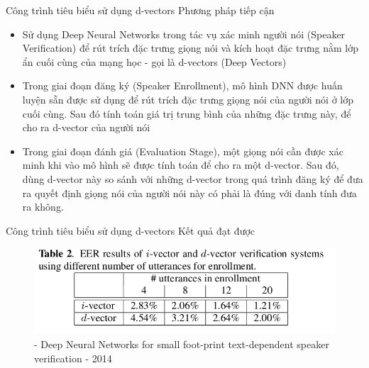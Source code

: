 \documentclass[notheorems, aspectratio=54]{beamer}
\begin{document}
\begin{frame}{Công trình tiêu biểu sử dụng d-vectors}
	Phương pháp tiếp cận
	\begin{itemize}
		\item Sử dụng Deep Neural Networks trong tác vụ xác minh người nói (Speaker Verification) để rút trích đặc trưng giọng nói và kích hoạt đặc trưng nằm lớp ẩn cuối cùng của mạng học - gọi là d-vectors (Deep Vectors)
		\item Trong giai đoạn đăng ký (Speaker Enrollment), mô hình DNN được huấn luyện sẵn được sử dụng để rút trích đặc trưng giọng nói của người nói ở lớp cuối cùng. Sau đó tính toán giá trị trung bình của những đặc trưng này, để cho ra d-vector của người nói
		\item 	Trong giai đoạn đánh giá (Evaluation Stage), một giọng nói cần được xác minh khi vào mô hình sẽ được tính toán để cho ra một d-vector. Sau đó, dùng d-vector này so sánh với những d-vector trong quá trình đăng ký để đưa ra quyết định giọng nói của người nói này có phải là đúng với danh tính đưa ra không.
	\end{itemize}
\end{frame}
\begin{frame}{Công trình tiêu biểu sử dụng d-vectors}
	Kết quả đạt được
	\begin{figure}[H]
		\centering
		\includegraphics[width=0.75\linewidth]{images/d-vectors-result-table-02.png}
		\caption{- Deep Neural Networks for small foot-print text-dependent speaker verification - 2014}
		\label{fig:writing-thesis}
	\end{figure}
\end{frame}
\end{document}
